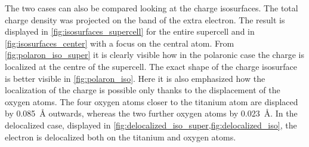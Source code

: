 The two cases can also be compared looking at the charge isosurfaces. The total charge density was projected on the band of the extra electron. The result is displayed in \cref{fig:isosurfaces_supercell} for the entire supercell and in \cref{fig:isosurfaces_center} with a focus on the central atom. From \cref{fig:polaron_iso_super} it is clearly visible how in the polaronic case the charge is localized at the centre of the supercell. The exact shape of the charge isosurface is better visible in \cref{fig:polaron_iso}. Here it is also emphasized how the localization of the charge is possible only thanks to the displacement of the oxygen atoms. The four oxygen atoms closer to the titanium atom are displaced by \SI{0.085}{\angstrom} outwards, whereas the two further oxygen atoms by \SI{0.023}{\angstrom}. In the delocalized case, displayed in \cref{fig:delocalized_iso_super,fig:delocalized_iso}, the electron is delocalized both on the titanium and oxygen atoms.


